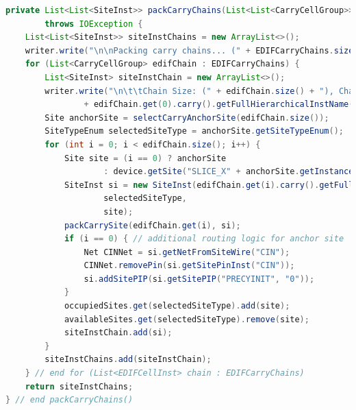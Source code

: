 \newpage
\begin{lstlisting}[language=java, caption={Packing \texttt{CarryCellGroup}s into \texttt{SLICEL} \texttt{SiteInst}s.}, label={lst:carry_chains}]
private List<List<SiteInst>> packCarryChains(List<List<CarryCellGroup>> EDIFCarryChains)
        throws IOException {
    List<List<SiteInst>> siteInstChains = new ArrayList<>();
    writer.write("\n\nPacking carry chains... (" + EDIFCarryChains.size() + ")");
    for (List<CarryCellGroup> edifChain : EDIFCarryChains) {
        List<SiteInst> siteInstChain = new ArrayList<>();
        writer.write("\n\t\tChain Size: (" + edifChain.size() + "), Chain Anchor: "
                + edifChain.get(0).carry().getFullHierarchicalInstName());
        Site anchorSite = selectCarryAnchorSite(edifChain.size());
        SiteTypeEnum selectedSiteType = anchorSite.getSiteTypeEnum();
        for (int i = 0; i < edifChain.size(); i++) {
            Site site = (i == 0) ? anchorSite
                    : device.getSite("SLICE_X" + anchorSite.getInstanceX() + "Y" + (anchorSite.getInstanceY() + i));
            SiteInst si = new SiteInst(edifChain.get(i).carry().getFullHierarchicalInstName(), design,
                    selectedSiteType,
                    site);
            packCarrySite(edifChain.get(i), si);
            if (i == 0) { // additional routing logic for anchor site
                Net CINNet = si.getNetFromSiteWire("CIN");
                CINNet.removePin(si.getSitePinInst("CIN"));
                si.addSitePIP(si.getSitePIP("PRECYINIT", "0"));
            }
            occupiedSites.get(selectedSiteType).add(site);
            availableSites.get(selectedSiteType).remove(site);
            siteInstChain.add(si);
        }
        siteInstChains.add(siteInstChain);
    } // end for (List<EDIFCellInst> chain : EDIFCarryChains)
    return siteInstChains;
} // end packCarryChains()

\end{lstlisting}



